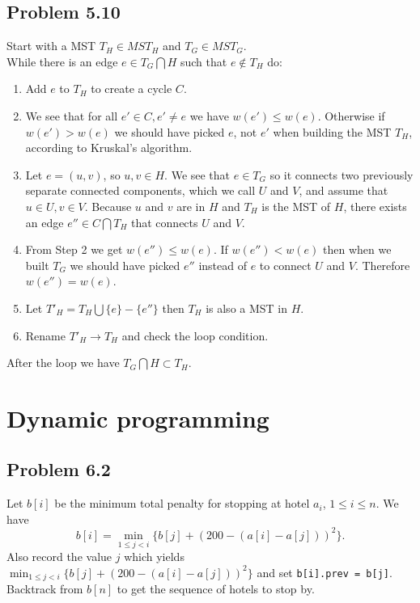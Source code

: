 \documentclass[12pt]{report}
\newcommand{\co}{\texttt}
\begin{document}
\section{Problem 5.10}
Start with a MST $T_H \in MST_H$ and $T_G \in MST_G$. \\
While there is an edge $e \in T_G \bigcap H$ such that $e \notin T_H$ do:
\begin{enumerate}
  \item Add $e$ to $T_H$ to create a cycle $C$.
  \item We see that for all $e' \in C, e' \ne e$ we have $w(e') \le w(e)$. Otherwise if $w(e') > w(e)$ we should have picked $e$, not $e'$ when building the MST $T_H$, according to Kruskal's algorithm.
  \item Let $e = (u,v)$, so $u, v \in H$. We see that $e \in T_G$ so it connects two previously separate connected components, which we call $U$ and $V$, and assume that $u \in U, v \in V$. Because $u$ and $v$ are in $H$ and $T_H$ is the MST of $H$, there exists an edge $e'' \in C \bigcap T_H$ that connects $U$ and $V$. 
  \item From Step 2 we get $w(e'') \le w(e)$. If $w(e'') < w(e)$ then when we built $T_G$ we should have picked $e''$ instead of $e$ to connect $U$ and $V$. Therefore $w(e'') = w(e)$. 
  \item Let $T'_H = T_H \bigcup \{ e \} - \{ e''\}$ then $T_H$ is also a MST in $H$.
  \item Rename $T'_H \to T_H$ and check the loop condition.
\end{enumerate}

After the loop we have $T_G \bigcap H \subset T_H$.

\chapter[Chapter 6 Solution]{Dynamic programming}
\section{Problem 6.2}
Let $b[i]$ be the minimum total penalty for stopping at hotel $a_i$, $1 \le i \le n$. We have $$b[i] = \min_{1 \le j < i} \{ b[j] + (200 - (a[i] - a[j]))^2\}.$$
Also record the value $j$ which yields $\displaystyle \min_{1 \le j < i} \{ b[j] + (200 - (a[i] - a[j]))^2\}$ and set \co{b[i].prev = b[j]}. Backtrack from $b[n]$ to get the sequence of hotels to stop by.
\end{document}
